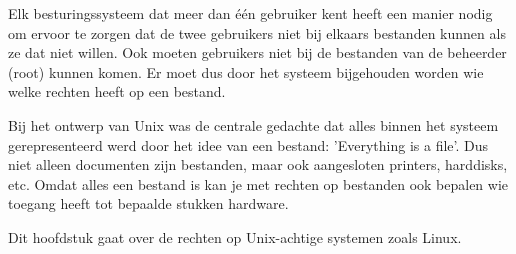 Elk besturingssysteem dat meer dan \'e\'en gebruiker kent heeft een manier nodig om ervoor te zorgen dat de twee gebruikers niet bij elkaars bestanden kunnen als ze dat niet willen. Ook moeten gebruikers niet bij de bestanden van de beheerder (root) kunnen komen. Er moet dus door het systeem bijgehouden worden wie welke rechten heeft op een bestand.

Bij het ontwerp van Unix was de centrale gedachte dat alles binnen het systeem gerepresenteerd werd door het idee van een bestand: 'Everything is a file'. Dus niet alleen documenten zijn bestanden, maar ook aangesloten printers, harddisks, etc. Omdat alles een bestand is kan je met rechten op bestanden ook bepalen wie toegang heeft tot bepaalde stukken hardware.

Dit hoofdstuk gaat over de rechten op Unix-achtige systemen zoals Linux.
